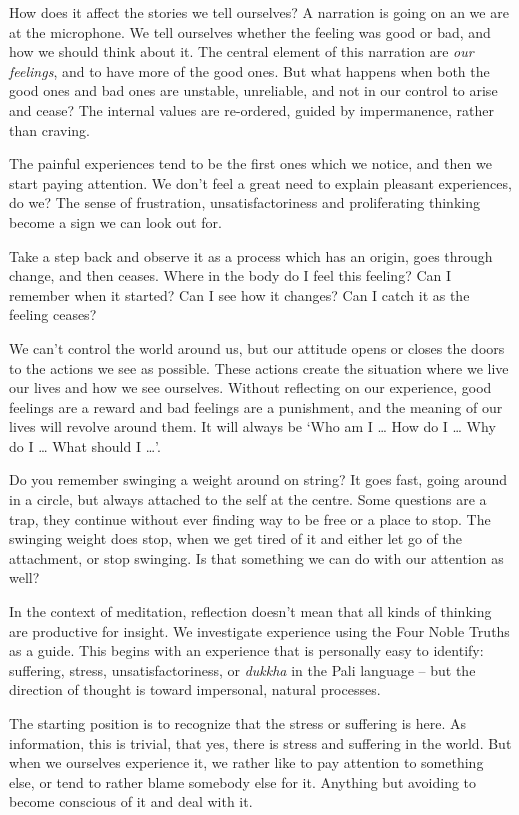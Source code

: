 How does it affect the stories we tell ourselves? A narration is going
on an we are at the microphone. We tell ourselves whether the feeling
was good or bad, and how we should think about it. The central element
of this narration are \emph{our feelings}, and to have more of the good
ones. But what happens when both the good ones and bad ones are
unstable, unreliable, and not in our control to arise and cease? The
internal values are re-ordered, guided by impermanence, rather than
craving.

The painful experiences tend to be the first ones which we notice, and
then we start paying attention. We don't feel a great need to explain
pleasant experiences, do we? The sense of frustration,
unsatisfactoriness and proliferating thinking become a sign we can look
out for.

Take a step back and observe it as a process which has an origin, goes
through change, and then ceases. Where in the body do I feel this
feeling? Can I remember when it started? Can I see how it changes? Can I
catch it as the feeling ceases?

We can't control the world around us, but our attitude opens or closes
the doors to the actions we see as possible. These actions create the
situation where we live our lives and how we see ourselves. Without
reflecting on our experience, good feelings are a reward and bad
feelings are a punishment, and the meaning of our lives will revolve
around them. It will always be `Who am I \ldots{} How do I \ldots{} Why
do I \ldots{} What should I \ldots{}'.

Do you remember swinging a weight around on string? It goes fast, going
around in a circle, but always attached to the self at the centre. Some
questions are a trap, they continue without ever finding way to be free
or a place to stop. The swinging weight does stop, when we get tired of
it and either let go of the attachment, or stop swinging. Is that
something we can do with our attention as well?

In the context of meditation, reflection doesn't mean that all kinds of
thinking are productive for insight. We investigate experience using the
Four Noble Truths as a guide. This begins with an experience that is
personally easy to identify: suffering, stress, unsatisfactoriness, or
\emph{dukkha} in the Pali language -- but the direction of thought is
toward impersonal, natural processes.

The starting position is to recognize that the stress or suffering is
here. As information, this is trivial, that yes, there is stress and
suffering in the world. But when we ourselves experience it, we rather
like to pay attention to something else, or tend to rather blame
somebody else for it. Anything but avoiding to become conscious of it
and deal with it.

